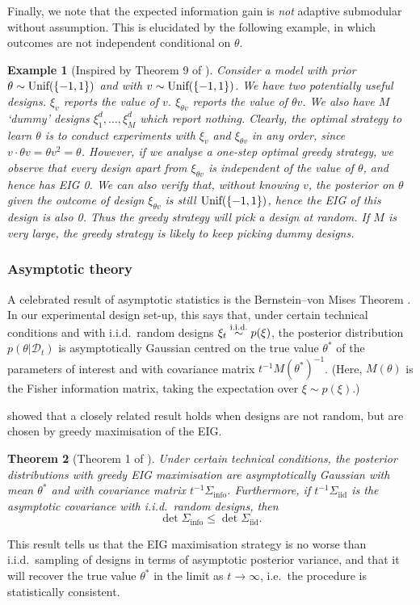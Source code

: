 \documentclass[a4paper, 10pt]{report}
\theoremstyle{plain}
\newtheorem{theorem}{Theorem}[chapter]
\newtheorem{example}[theorem]{Example}
\begin{document}
	Finally, we note that the expected information gain is \emph{not} adaptive submodular without assumption. This is elucidated by the following example, in which outcomes are not independent conditional on $\theta$.
	\begin{example}[Inspired by Theorem 9 of \citet{golovin2010}]\label{example:golovin}
		Consider a model with prior $\theta \sim \textup{Unif}(\{-1, 1\})$ and with $v \sim \textup{Unif}(\{-1, 1\})$.
		We have two potentially useful designs. $\xi_v$ reports the value of $v$. $\xi_{\theta v}$ reports the value of $\theta v$.
		We also have $M$ `dummy' designs $\xi^d_1,\dots,\xi^d_M$ which report nothing.
		Clearly, the optimal strategy to learn $\theta$ is to conduct experiments with $\xi_v$ and $\xi_{\theta v}$ in any order, since $v \cdot \theta v = \theta v^2 = \theta$.
		However, if we analyse a one-step optimal greedy strategy, we observe that every design apart from $\xi_{\theta v}$ is independent of the value of $\theta$, and hence has EIG 0. We can also verify that, without knowing $v$, the posterior on $\theta$ given the outcome of design $\xi_{\theta v}$ is still $ \textup{Unif}(\{-1, 1\})$, hence the EIG of this design is also 0.
		Thus the greedy strategy will pick a design at random. If $M$ is very large, the greedy strategy is likely to keep picking dummy designs.
	\end{example}
	
	
	\subsubsection{Asymptotic theory}
	
	A celebrated result of asymptotic statistics is the Bernstein--von Mises Theorem \citep{van2000asymptotic}.
	In our experimental design set-up, this says that, under certain technical conditions and with i.i.d.~random designs $\xi_t \overset{\scriptstyle{\text{i.i.d.}}}{\sim} p(\xi)$, the posterior distribution $p(\theta|\mathcal{D}_t)$ is asymptotically Gaussian centred on the true value $\theta^*$ of the parameters of interest and with covariance matrix $t^{-1}M(\theta^*)^{-1}$. (Here, $M(\theta)$ is the Fisher information matrix, taking the expectation over $\xi\sim p(\xi)$.)
	
	\citet{paninski2005asymptotic} showed that a closely related result holds when designs are not random, but are chosen by greedy maximisation of the EIG.
	\begin{theorem}[Theorem 1 of \citet{paninski2005asymptotic}]
		Under certain technical conditions, the posterior distributions with greedy EIG maximisation are asymptotically Gaussian with mean $\theta^*$ and with covariance matrix $t^{-1}\Sigma_\text{info}$.
		Furthermore, if $t^{-1}\Sigma_\text{iid}$ is the asymptotic covariance with i.i.d.~random designs, then
		\begin{equation}
		\det \Sigma_\text{info} \le \det \Sigma_\text{iid}.
		\end{equation}
	\end{theorem}
	This result tells us that the EIG maximisation strategy is no worse than i.i.d.~sampling of designs in terms of asymptotic posterior variance, and that it will recover the true value $\theta^*$ in the limit as $t\to\infty$, i.e.~the procedure is statistically consistent.
	
\end{document}

